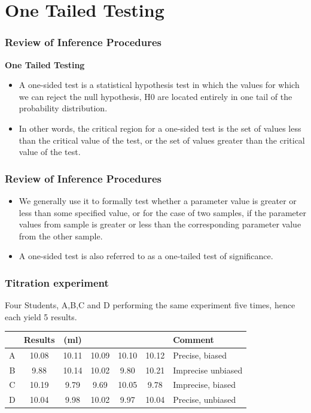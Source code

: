 \documentclass{beamer}
\begin{document}
\section{One Tailed Testing}
\begin{frame}
\frametitle{Review of Inference Procedures}
\large
\noindent \textbf{One Tailed Testing}
\begin{itemize}
	\item A one-sided test is a statistical hypothesis test in which the values
	for which we can reject the null hypothesis, H0 are located entirely
	in one tail of the probability distribution.
	\item In other words, the critical region for a one-sided test is the set of
	values less than the critical value of the test, or the set of values
	greater than the critical value of the test.
\end{itemize}


\end{frame}
\begin{frame}
\frametitle{Review of Inference Procedures}
\large
\begin{itemize}
	\item We generally use it to formally test whether a parameter value is
	greater or less than some specified value, or for the case of two
	samples, if the parameter values from sample is greater or less
	than the corresponding parameter value from the other sample.
	\item A one-sided test is also referred to as a one-tailed test of
	significance.
\end{itemize}


\end{frame}
\begin{frame}
\frametitle{Titration experiment}
	
Four Students, A,B,C and D performing the same experiment five times, hence each yield 5 results.%

	\begin{tabular}{|c|ccccc|l|}
		\hline
		 & Results  & (ml) &  &  &  &Comment \\ \hline
		A & 10.08 & 10.11 &10.09 &10.10&10.12 & Precise, biased\\ \hline
		B & 9.88 &10.14& 10.02 &9.80& 10.21& Imprecise unbiased\\ \hline
		C & 10.19 &9.79& 9.69 &10.05& 9.78 & Imprecise, biased\\ \hline
		D & 10.04 &9.98 &10.02 &9.97 &10.04 & Precise, unbiased \\
		\hline
	\end{tabular}\\
\end{frame}
\end{document}

